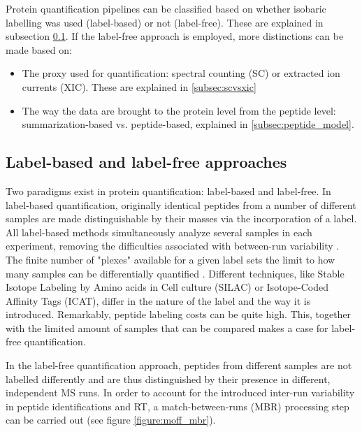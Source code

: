 Protein quantification pipelines can be classified based on whether isobaric labelling was used (label-based) or not (label-free). These are explained in subsection \ref{subsec:labelling}. If the label-free approach is employed, more distinctions can be made based on:

\begin{itemize}
\item The proxy used for quantification: spectral counting (\ac{SC}) or extracted ion currents (\ac{XIC}). These are explained in \ref{subsec:scvsxic}


\item The way the data are brought to the protein level from the peptide level: summarization-based vs. peptide-based, explained in \ref{subsec:peptide_model}.
\end{itemize}

\subsection{Label-based and label-free approaches}
\label{subsec:labelling}


Two paradigms exist in protein quantification: label-based and label-free. In label-based quantification, originally identical peptides from a number of different samples are made distinguishable by their masses via the incorporation of a label. All label-based methods simultaneously analyze several samples in each experiment, removing the difficulties associated with between-run variability \cite{Barsnes2008}. The finite number of "plexes" available for a given label sets the limit to how many samples can be differentially quantified \cite{Cox2014}. Different techniques, like Stable Isotope Labeling by Amino acids in Cell culture (SILAC) or Isotope-Coded Affinity Tags (ICAT), differ in the nature of the label and the way it is introduced. Remarkably, peptide labeling costs can be quite high. This, together with the limited amount of samples that can be compared makes a case for label-free quantification.

In the label-free quantification approach, peptides from different samples are not labelled differently and are thus distinguished by their presence in different, independent \ac{MS} runs. In order to account for the introduced inter-run variability in peptide identifications and \ac{RT}, a match-between-runs (MBR) processing step can be carried out (see figure \ref{figure:moff_mbr}). 


